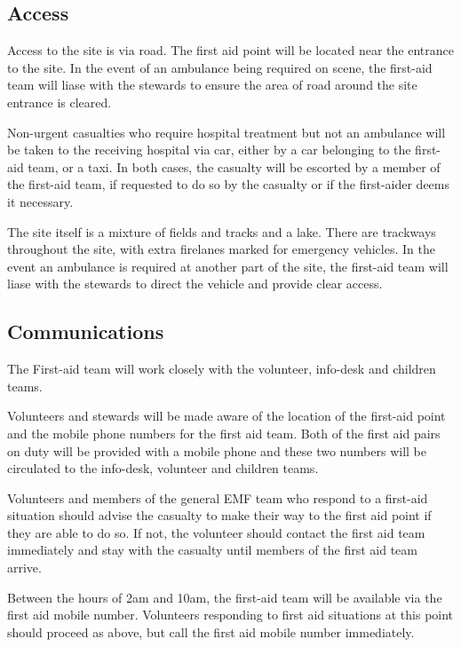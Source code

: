 \subsection{Access}

Access to the site is via road. The first aid point will be located near the entrance to the site. In the event of an ambulance being required on scene, the first-aid team will liase with the stewards to ensure the area of road around the site entrance is cleared.

Non-urgent casualties who require hospital treatment but not an ambulance will be taken to the receiving hospital via car, either by a car belonging to the first-aid team, or a taxi. In both cases, the casualty will be escorted by a member of the first-aid team, if requested to do so by the casualty or if the first-aider deems it necessary.  

The site itself is a mixture of fields and tracks and a lake. There are trackways throughout the site, with extra firelanes marked for emergency vehicles. In the event an ambulance is required at another part of the site, the first-aid team will liase with the stewards to direct the vehicle and provide clear access. 

\subsection{Communications}

The First-aid team will work closely with the volunteer, info-desk and children teams.

Volunteers and stewards will be made aware of the location of the first-aid point and the mobile phone numbers for the first aid team. Both of the first aid pairs on duty will be provided with a mobile phone and these two numbers will be circulated to the info-desk, volunteer and children teams. 

Volunteers and members of the general EMF team who respond to a first-aid situation should advise the casualty to make their way to the first aid point if they are able to do so. If not, the volunteer should contact the first aid team immediately and stay with the casualty until members of the first aid team arrive.

Between the hours of 2am and 10am, the first-aid team will be available via the first aid mobile number. Volunteers responding to first aid situations at this point should proceed as above, but call the first aid mobile number immediately. 

